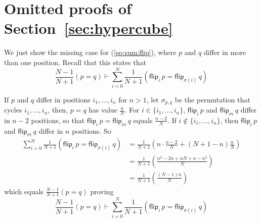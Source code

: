 \documentclass[a4paper,UKenglish,cleveref, autoref, thm-restate]{lipics-v2021}
\newcommand{\ts}{\vdash}
\newcommand{\flip}{\mathsf{flip}}
\newcommand{\bijarg}[2]{\sigma_{#1,#2}}
\newcommand{\bij}{\sigma}
\newcommand{\peq}{=}
\begin{document}
\section{Omitted proofs of Section~\ref{sec:hypercube}}

We just show the missing case for (\ref{eq:sum:flip}), where $p$ and $q$ differ in more than one position. Recall
that this states that 
\[
\frac{N\!-\!1}{N\!+\!1}(p\peq q) \ts \sum_{i=0}^N\frac1{N\!+\!1}(\flip_i\,p \peq \flip_{\bij(i)}\,q)
\]
 
If $p$ and $q$ differ in positions $i_1,\dots, i_n$ for $n>1$, let $\bijarg pq$ be the permutation
that cycles $i_1,\dots, i_n$, then, $p \peq q$ has value $\frac nN$. For $i \in \{i_1,\dots, i_n\}$, 
$\flip_i \,p$ and $ \flip_{\bij i} \,q$ differ in $n-2$ positions, so that $\flip_i \,p \peq \flip_{\bij i} \,q$ equals $\frac{n-2}N$.
If $i \notin \{i_1,\dots, i_n\}$, then $\flip_i\,p$ and $ \flip_{\bij i}\,q$ differ in $n$ positions. So 
\begin{align*}
 \sum_{i=0}^N\frac1{N\!+\!1}(\flip_i\,p \peq \flip_{\bij(i)}\,q) & =  \frac1{N\!+\!1}(n \cdot \frac{n-2}N + (N\!+\!1\!-\!n)\frac nN) \\
 & = \frac1{N\!+\!1}\left(\frac{n^2-2n+nN+n-n^2}N\right) \\
 & = \frac1{N\!+\!1}\left(\frac{(N-1)n}N\right) %
\end{align*}
which equals $\frac{N\!-\!1}{N\!+\!1}(p\peq q)$ proving
\[
\frac{N\!-\!1}{N\!+\!1}(p\peq q) \ts \sum_{i=0}^N\frac1{N\!+\!1}(\flip_i\,p \peq \flip_{\bij(i)}\,q)
\]
\end{document}

